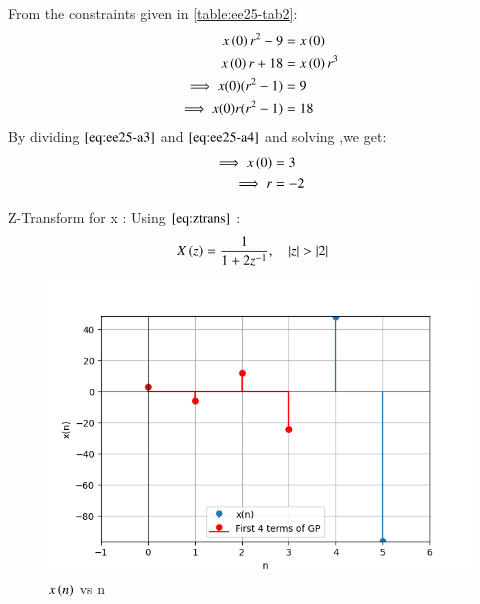 \documentclass[journal,12pt,onecolumn]{IEEEtran}
\theoremstyle{remark}
\begin{document}
    
\begin{enumerate}
From the constraints given in \ref{table:ee25-tab2}:
   \begin{align}
x\left(0\right)r^2 - 9 &= x\left(0\right) \label{eq:ee25-a1}\\
x\left(0\right)r + 18 &= x\left(0\right)r^3 \label{eq:ee25-a2}\\
\implies x(0)(r^2-1) &= 9 \label{eq:ee25-a3}\\
\implies x (0)r(r^2-1) &=18
\label{eq:ee25-a4}
\end{align}
By dividing $\eqref{eq:ee25-a3}$ and $\eqref{eq:ee25-a4}$ and solving ,we get: 
\begin{align}
    \implies
    x\left(0\right) &= 3\\
    \implies
    r &= -2
\end{align}

 Z-Transform for x :
    Using $\eqref{eq:ztrans}$ :
    \begin{align}
    X\left(z\right) &= \frac{1}{1+2z^{-1}},\quad \left\vert z\right\vert>\left\vert2\right\vert 
    \end{align}
    
\end{enumerate}
    \begin{figure}[!ht]    
    \centering
\graphicspath{ {figs/} }
\includegraphics[width=\columnwidth]{graph_1}
\caption{ $x\left(n\right)$ vs n }
\label{graph:ee25-ag2}
\end{figure}







 
\end{document}
